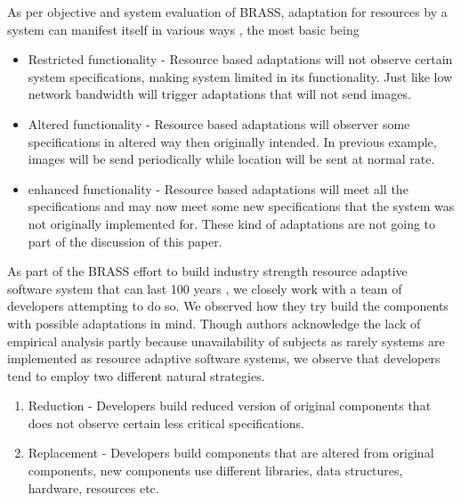 As per objective and system evaluation of BRASS, adaptation for resources by a system can manifest itself in various ways \cite{darpa1}, the most basic being \begin{itemize}
\item Restricted functionality - Resource based adaptations will not observe certain system specifications, making system limited in its functionality. Just like low network bandwidth will trigger adaptations that will not send images.
\item Altered functionality - Resource based adaptations will observer some specifications in altered way then originally intended. In previous example, images will be send periodically while location will be sent at normal rate.
\item enhanced functionality - Resource based adaptations will meet all the specifications and may now meet some new specifications that the system was not originally implemented for. These kind of adaptations are not going to part of the discussion of this paper.  
\end{itemize}


As part of the BRASS effort to build industry strength resource adaptive software system that can last 100 years \cite{darpa2}, we closely work with a team of developers attempting to do so. We observed how they try build the components with possible adaptations in mind. Though authors acknowledge the lack of empirical analysis partly because unavailability of subjects as rarely systems are implemented as resource adaptive software systems, we observe that developers tend to employ two different natural strategies.

\begin{enumerate}
\item Reduction - Developers build reduced version of original components that does not observe certain less critical specifications.
\item Replacement - Developers build components that are altered from original components, new components use different libraries, data structures, hardware, resources etc.  
\end{enumerate}

